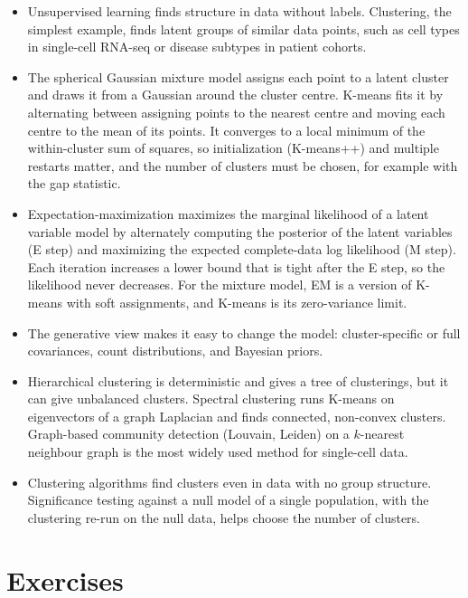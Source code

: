 \begin{itemize}
  \item Unsupervised learning finds structure in data without labels. Clustering, the simplest example, finds latent groups of similar data points, such as cell types in single-cell RNA-seq or disease subtypes in patient cohorts.
  \item The spherical Gaussian mixture model assigns each point to a latent cluster and draws it from a Gaussian around the cluster centre. K-means fits it by alternating between assigning points to the nearest centre and moving each centre to the mean of its points. It converges to a local minimum of the within-cluster sum of squares, so initialization (K-means++) and multiple restarts matter, and the number of clusters must be chosen, for example with the gap statistic.
  \item Expectation-maximization maximizes the marginal likelihood of a latent variable model by alternately computing the posterior of the latent variables (E step) and maximizing the expected complete-data log likelihood (M step). Each iteration increases a lower bound that is tight after the E step, so the likelihood never decreases. For the mixture model, EM is a version of K-means with soft assignments, and K-means is its zero-variance limit.
  \item The generative view makes it easy to change the model: cluster-specific or full covariances, count distributions, and Bayesian priors.
  \item Hierarchical clustering is deterministic and gives a tree of clusterings, but it can give unbalanced clusters. Spectral clustering runs K-means on eigenvectors of a graph Laplacian and finds connected, non-convex clusters. Graph-based community detection (Louvain, Leiden) on a $k$-nearest neighbour graph is the most widely used method for single-cell data.
  \item Clustering algorithms find clusters even in data with no group structure. Significance testing against a null model of a single population, with the clustering re-run on the null data, helps choose the number of clusters.
\end{itemize}

\section*{Exercises}

